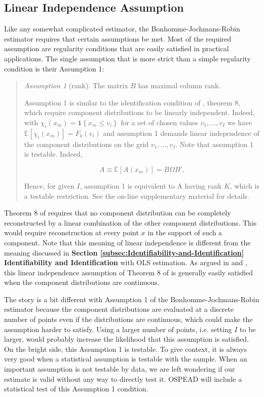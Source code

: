\documentclass[english]{article}
\begin{document}
\subsection{Linear Independence Assumption}

Like any somewhat complicated estimator, the Bonhomme-Jochmans-Robin
estimator requires that certain assumptions be met. Most of the required
assumption are regularity conditions that are easily satisfied in
practical applications. The single assumption that is more strict
than a simple regularity condition is their Assumption 1:
\begin{quote}
\textit{Assumption 1} (rank). The matrix $B$ has maximal column rank.

Assumption 1 is similar to the identification condition of \cite{AllmanMatiasRhodes2009},
theorem 8, which require component distributions to be linearly independent.
Indeed, with $\chi_{i}(x_{m})=\mathbf{1}\left\{ x_{m}\leqslant v_{i}\right\} $
for a set of chosen values $v_{1},\dots,v_{I}$ we have $\mathbb{E}\left[\chi_{i}(x_{m})\right]=F_{k}(v_{i})$
and assumption 1 demands linear independence of the component distributions
on the grid $v_{1},\dots,v_{I}$. Note that assumption 1 is testable.
Indeed,

\[
A\equiv\mathbb{E}\left[A(x_{m})\right]=B\Omega B'.
\]

Hence, for given $I$, assumption 1 is equivalent to A having rank
$K$, which is a testable restriction. See the on-line supplementary
material for details.
\end{quote}
Theorem 8 of \cite{AllmanMatiasRhodes2009} requires that no component
distribution can be completely reconstructed by a linear combination
of the other component distributions. This would require reconstruction
at every point $x$ in the support of such a component. Note that
this meaning of linear independence is different from the meaning
discussed in \textbf{Section \ref{subsec:Identifiability-and-Identification}
Identifiability and Identification} with OLS estimation. As argued
in \cite{Mbakop2017IdentificationOA} and \cite{KwonMbakop2021},
this linear independence assumption of Theorem 8 of \cite{AllmanMatiasRhodes2009}
is generally easily satisfied when the component distributions are
continuous.

The story is a bit different with Assumption 1 of the Bonhomme-Jochmans-Robin
estimator because the component distributions are evaluated at a discrete
number of points even if the distributions are continuous, which could
make the assumption harder to satisfy. Using a larger number of points,
i.e. setting $I$ to be larger, would probably increase the likelihood
that this assumption is satisfied. On the bright side, this Assumption
1 is testable. To give context, it is always very good when a statistical
assumption is testable with the sample. When an important assumption
is not testable by data, we are left wondering if our estimate is
valid without any way to directly test it. OSPEAD will include a statistical
test of this Assumption 1 condition.
\end{document}
